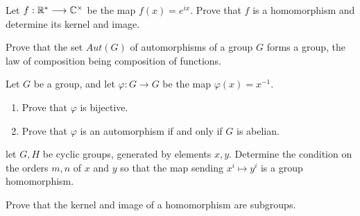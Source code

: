 \begin{boxedProblem}[2.4.6]
    Let $f:\mathbb{R}^* \longrightarrow \mathbb{C}^\times$ be the map $f(x) = e^{ix}$. Prove that $f$ is a homomorphism and determine its kernel and image.
\end{boxedProblem}

\begin{boxedProblem}[2.3.11]
    Prove that the set $Aut(G)$ of automorphisms of a group $G$ forms a group, the law of composition being composition of functions.
\end{boxedProblem}

\begin{boxedProblem}[2.3.12]
    Let $G$ be a group, and let $\varphi:G \longrightarrow G$ be the map $\varphi(x) = x^{-1}$.
    \begin{enumerate}
    \item Prove that $\varphi$ is bijective.
    \item Prove that $\varphi$ is an automorphism if and only if $G$ is abelian.
\end{enumerate}
\end{boxedProblem}

\begin{boxedProblem}[2.4.11]
    let $G, H$ be cyclic groups, generated by elements $x, y$. Determine the condition on the orders $m, n$ of $x$ and $y$ so that the map sending $x^i \longmapsto y^i$ is a group homomorphism.
\end{boxedProblem}

\begin{boxedProblem}[2.4.3]
    Prove that the kernel and image of a homomorphism are subgroups.
\end{boxedProblem}
